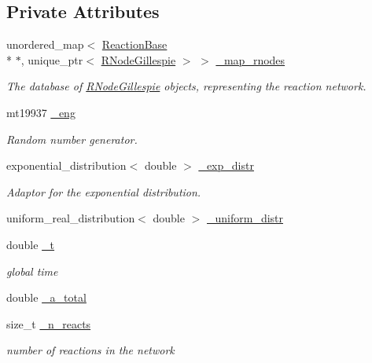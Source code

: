 \subsection*{Private Attributes}
\begin{DoxyCompactItemize}
\item 
unordered\+\_\+map$<$ \hyperlink{classReactionBase}{Reaction\+Base} \\*
$\ast$, unique\+\_\+ptr$<$ \hyperlink{classRNodeGillespie}{R\+Node\+Gillespie} $>$ $>$ \hyperlink{classChemGillespieImpl_ab8d6bcef48ea219a249cebdb436dbc30}{\+\_\+map\+\_\+rnodes}
\begin{DoxyCompactList}\small\item\em The database of \hyperlink{classRNodeGillespie}{R\+Node\+Gillespie} objects, representing the reaction network. \end{DoxyCompactList}\item 
mt19937 \hyperlink{classChemGillespieImpl_a27162663b9cf776971f2f32483c6fe95}{\+\_\+eng}
\begin{DoxyCompactList}\small\item\em Random number generator. \end{DoxyCompactList}\item 
exponential\+\_\+distribution$<$ double $>$ \hyperlink{classChemGillespieImpl_a6ea99580ca00386e7db98a4059fbed0c}{\+\_\+exp\+\_\+distr}
\begin{DoxyCompactList}\small\item\em Adaptor for the exponential distribution. \end{DoxyCompactList}\item 
uniform\+\_\+real\+\_\+distribution$<$ double $>$ \hyperlink{classChemGillespieImpl_a6d37367996fad3157b63e6750ce6569b}{\+\_\+uniform\+\_\+distr}
\item 
double \hyperlink{classChemGillespieImpl_ab709229380a7bd5458d6c4b382036a7a}{\+\_\+t}
\begin{DoxyCompactList}\small\item\em global time \end{DoxyCompactList}\item 
double \hyperlink{classChemGillespieImpl_aeec18c37a7c9ad88199a78d613e7f8ac}{\+\_\+a\+\_\+total}
\item 
size\+\_\+t \hyperlink{classChemGillespieImpl_ae66f4f44055f9af574bd334f78f92393}{\+\_\+n\+\_\+reacts}
\begin{DoxyCompactList}\small\item\em number of reactions in the network \end{DoxyCompactList}\end{DoxyCompactItemize}


